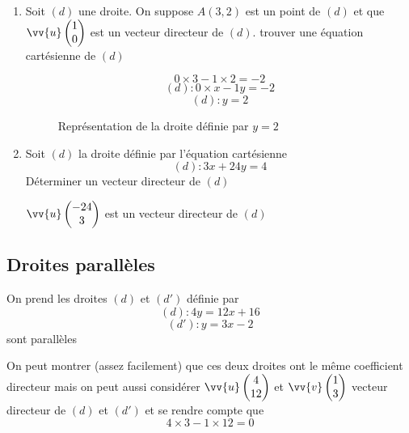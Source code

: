 \begin{exemples}
\begin{enumerate}
\item Soit $(d)$ une droite. On suppose $A(3,2)$ est un point de $(d)$ et que $\vv{u}\covec{1}{0}$ est un vecteur directeur de $(d)$. trouver une équation cartésienne de $(d)$\newline

$$0\times 3 -1\times 2 =-2$$
$$(d) : 0\times x - 1y =-2$$
$$(d) : y=2$$
\begin{figure}[H]
\centering
{}
\caption{Représentation de la droite définie par $y=2$}
\end{figure}
\item Soit $(d)$ la droite définie par l'équation cartésienne 
$$(d):3x+24y = 4$$
Déterminer un vecteur directeur de $(d)$\newline

$\vv{u}\covec{-24}{3}$ est un vecteur directeur de $(d)$
\end{enumerate}
\end{exemples}
\subsection{Droites parallèles}
\newline

\begin{exemple}
On prend les droites $(d)$ et $(d')$ définie par 
$$(d) : 4y = 12x +16$$
$$(d') : y = 3x -2$$ sont parallèles\newline

On peut montrer (assez facilement) que ces deux droites ont le même coefficient directeur mais on peut aussi considérer $\vv{u} \covec{4}{12}$ et $\vv{v} \covec{1}{3}$ vecteur directeur de $(d)$ et $(d')$ et se rendre compte que $$4\times 3 -1 \times 12 = 0$$ 
\end{exemple}

